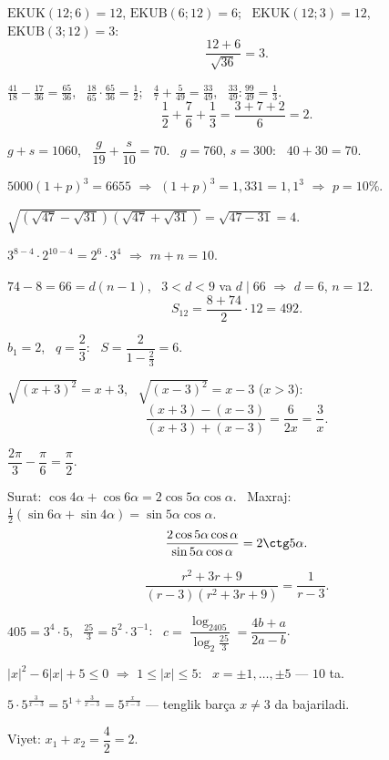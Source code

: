 




$\text{EKUK}(12;6)=12$, $\text{EKUB}(6;12)=6$; \ $\text{EKUK}(12;3)=12$, $\text{EKUB}(3;12)=3$:
\[\frac{12+6}{\sqrt{36}}=3.\]

$\frac{41}{18}-\frac{17}{36}=\frac{65}{36}$, \ $\frac{18}{65}\cdot\frac{65}{36}=\frac12$; \ $\frac47+\frac5{49}=\frac{33}{49}$, \ $\frac{33}{49}:\frac{99}{49}=\frac13$.
\[\frac12+\frac76+\frac13=\frac{3+7+2}6=2.\]

$g+s=1060$, \ $\dfrac g{19}+\dfrac s{10}=70$. \ $g=760$, $s=300$: \ $40+30=70$.

$5000(1+p)^3=6655$ $\Rightarrow$ $(1+p)^3=1{,}331=1{,}1^3$ $\Rightarrow$ $p=10\%$.

$\sqrt{\left(\sqrt{47}-\sqrt{31}\right)\left(\sqrt{47}+\sqrt{31}\right)}=\sqrt{47-31}=4$.

$3^{8-4}\cdot2^{10-4}=2^6\cdot3^4$ $\Rightarrow$ $m+n=10$.

$74-8=66=d(n-1)$, \ $3<d<9$ va $d\mid66$ $\Rightarrow$ $d=6$, $n=12$.
\[S_{12}=\frac{8+74}2\cdot12=492.\]

$b_1=2$, \ $q=\dfrac23$: \ $S=\dfrac2{1-\frac23}=6$.

$\sqrt{(x+3)^2}=x+3$, \ $\sqrt{(x-3)^2}=x-3$ ($x>3$):
\[\frac{(x+3)-(x-3)}{(x+3)+(x-3)}=\frac6{2x}=\frac3x.\]

$\dfrac{2\pi}3-\dfrac\pi6=\dfrac\pi2$.

Surat: $\cos4\alpha+\cos6\alpha=2\cos5\alpha\cos\alpha$. \ Maxraj: $\frac12\left(\sin6\alpha+\sin4\alpha\right)=\sin5\alpha\cos\alpha$.
\[\frac{2\cos5\alpha\cos\alpha}{\sin5\alpha\cos\alpha}=2\ctg5\alpha.\]

\[\frac{r^2+3r+9}{(r-3)\left(r^2+3r+9\right)}=\frac1{r-3}.\]

$405=3^4\cdot5$, \ $\frac{25}3=5^2\cdot3^{-1}$: \ $c=\dfrac{\log_2405}{\log_2\frac{25}3}=\dfrac{4b+a}{2a-b}$.

$|x|^2-6|x|+5\le0$ $\Rightarrow$ $1\le|x|\le5$: \ $x=\pm1,\dots,\pm5$ — $10$ ta.

$5\cdot5^{\frac3{x-3}}=5^{1+\frac3{x-3}}=5^{\frac x{x-3}}$ — tenglik barça $x\ne3$ da bajariladi.

Viyet: $x_1+x_2=\dfrac42=2$.

